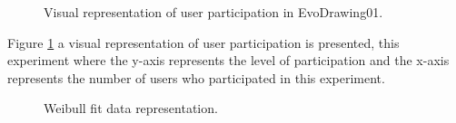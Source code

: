 \begin{figure}
\centering
{} %
\caption{Visual representation of user participation in EvoDrawing01.}
\label{fig:userP_1}
\end{figure}

Figure \ref{fig:userP_1}  a visual representation of user
participation is presented, this experiment where the y-axis represents the level of
participation and the x-axis represents the number of users who participated in
this experiment.

\begin{figure}
\centering
{} %
\caption{Weibull fit data representation.}
\label{fig:weibull_1}
\end{figure}


